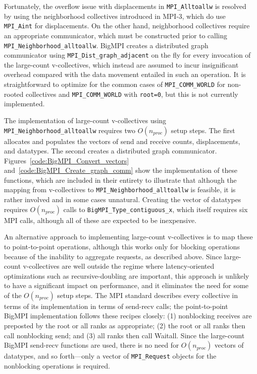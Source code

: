 Fortunately, the overflow issue with displacements in \texttt{MPI\_Alltoallw} is
resolved by using the neighborhood collectives introduced in MPI-3, which do
use \texttt{MPI\_Aint} for displacements.
On the other hand, neighborhood collectives require an appropriate
communicator, which must be constructed prior to calling \texttt{MPI\_Neighborhood\_alltoallw}.
BigMPI creates a distributed graph communicator using \texttt{MPI\_Dist\_graph\_adjacent}
on the fly for every invocation of the large-count v-collectives, which instead are assumed to incur
insignificant overhead compared with the data movement entailed in such an operation.
It is straightforward to optimize for the common cases of \texttt{MPI\_COMM\_WORLD} for
non-rooted collectives and \texttt{MPI\_COMM\_WORLD} with \texttt{root=0}, but this 
is not currently implemented.

The implementation of large-count v-collectives using \texttt{MPI\_Neighborhood\_alltoallw} 
requires two $O(n_{proc})$ setup steps. The first allocates and populates the vectors of 
send and receive counts, displacements, and datatypes. 
The second creates a distributed graph communicator.
Figures~\ref{code:BigMPI_Convert_vectors} and~\ref{code:BigMPI_Create_graph_comm}
show the implementation of these functions, which are included in their entirety to illustrate that
although the mapping from v-collectives to \texttt{MPI\_Neighborhood\_alltoallw} is feasible,
it is rather involved and in some cases unnatural.
Creating the vector of datatypes requires $O(n_{proc})$ calls to \texttt{BigMPI\_Type\_contiguous\_x},
which itself requires six MPI calls, although all of these are expected to be inexpensive.


An alternative approach to implementing large-count v-collectives is to map
these to point-to-point operations, although this works only for blocking operations
because of the inability to aggregate requests, as described above.
Since large-count v-collectives are well outside the regime where latency-oriented 
optimizations such as recursive-doubling are important, this approach is unlikely to have a significant impact 
on performance, and it eliminates the need for some of the $O(n_{proc})$ setup steps.
The MPI standard describes every collective in terms of its implementation 
in terms of send-recv calls; the point-to-point BigMPI implementation 
follows these recipes closely:
(1) nonblocking receives are preposted by the root or all ranks as appropriate;
(2) the root or all ranks then call nonblocking send; 
and (3) all ranks then call Waitall.
Since the large-count BigMPI send-recv functions are used, there is no need for
$O(n_{proc})$ vectors of datatypes, and so forth---only a vector of \texttt{MPI\_Request}
objects for the nonblocking operations is required.

